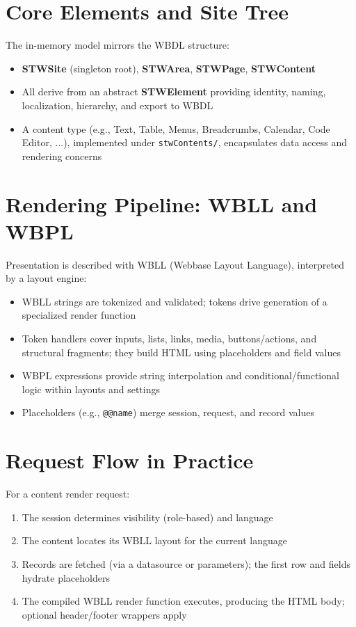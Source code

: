 \section{Core Elements and Site Tree}
The in-memory model mirrors the WBDL structure:
\begin{itemize}
	\item \textbf{STWSite} (singleton root), \textbf{STWArea}, \textbf{STWPage}, \textbf{STWContent}
	\item All derive from an abstract \textbf{STWElement} providing identity, naming, localization, hierarchy, and export to WBDL
	\item A content type (e.g., Text, Table, Menus, Breadcrumbs, Calendar, Code Editor, ...), implemented under \texttt{stwContents/}, encapsulates data access and rendering concerns
\end{itemize}

\section{Rendering Pipeline: WBLL and WBPL}
Presentation is described with WBLL (Webbase Layout Language), interpreted by a layout engine:
\begin{itemize}
	\item WBLL strings are tokenized and validated; tokens drive generation of a specialized render function
	\item Token handlers cover inputs, lists, links, media, buttons/actions, and structural fragments; they build HTML using placeholders and field values
	\item WBPL expressions provide string interpolation and conditional/functional logic within layouts and settings
	\item Placeholders (e.g., \verb|@@name|) merge session, request, and record values
\end{itemize}

\section{Request Flow in Practice}
For a content render request:
\begin{enumerate}
	\item The session determines visibility (role-based) and language
	\item The content locates its WBLL layout for the current language
	\item Records are fetched (via a datasource or parameters); the first row and fields hydrate placeholders
	\item The compiled WBLL render function executes, producing the HTML body; optional header/footer wrappers apply
\end{enumerate}

